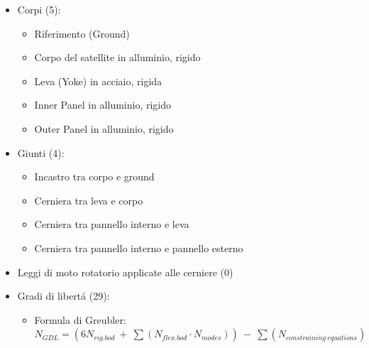 \documentclass{article}
\begin{document}
        \begin{itemize}
            \item Corpi (5):
            \begin{itemize}
                \item Riferimento (Ground) 
                \item Corpo del satellite in alluminio, rigido
                \item Leva (Yoke) in acciaio, rigida
                \item Inner Panel in alluminio, rigido
                \item Outer Panel in alluminio, rigido
            \end{itemize}
            \item Giunti (4):
            \begin{itemize}
                \item Incastro tra corpo e ground
                \item Cerniera tra leva e corpo
                \item Cerniera tra pannello interno e leva
                \item Cerniera tra pannello interno e pannello esterno
            \end{itemize}
            \item Leggi di moto rotatorio applicate alle cerniere (0)
            \item Gradi di libertá (29):
            \begin{itemize}
                \item Formula di Greubler: \\ 
                $N_{GDL} = (6N_{rig.bod} \ + \ \sum (N_{flex.bod} \cdot N_{modes})) \ - \ \sum (N_{constraining \ equations}) $
            \end{itemize}
        \end{itemize}

        

        \clearpage
        \printbibliography
\end{document}

